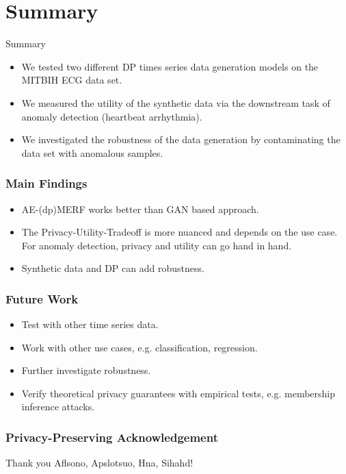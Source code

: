 \section{Summary}
\begin{frame}{Summary}
    \begin{itemize}
        \item<1-> We tested two different \alert{DP times series data generation} models on the MITBIH ECG data set.
        \item<2-> We measured the \alert{utility} of the synthetic data via the downstream task of anomaly detection (heartbeat arrhythmia).
        \item<3-> We investigated the \alert{robustness} of the data generation by \alert{contaminating} the data set with anomalous samples.
    \end{itemize}
\end{frame}

\begin{frame}
    \frametitle{Main Findings}
        \begin{itemize}
            \item<1-> AE-(dp)MERF works better than GAN based approach.
            \item<2-> The \alert{Privacy-Utility-Tradeoff is more nuanced} and depends on the use case. For anomaly detection, privacy and utility can go hand in hand.
            \item<3-> Synthetic data and DP can add \alert{robustness}.
        \end{itemize}
\end{frame}

\begin{frame}
    \frametitle{Future Work}
    \begin{itemize}
        \item<1-> Test with \alert{other time series data}.
        \item<2-> Work with \alert{other use cases}, e.g. classification, regression.
        \item<3-> Further investigate \alert{robustness}.
        \item<4-> Verify theoretical privacy guarantees with empirical tests, e.g. \alert{membership inference attacks}.
    \end{itemize}
\end{frame}

\begin{frame}
    \frametitle{Privacy-Preserving Acknowledgement}

    \huge
    Thank you Aflsono, Apslotsuo, Hna, Sihahd!
    

\end{frame}